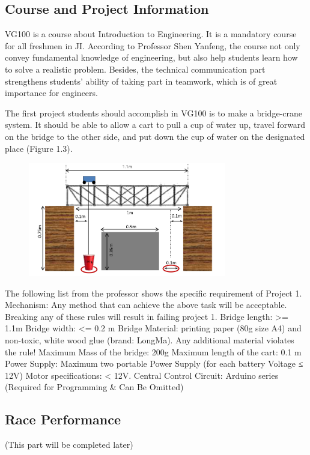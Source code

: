 \subsection{Course and Project Information}


VG100 is a course about Introduction to Engineering. It is a mandatory course
for all freshmen in JI. According to Professor Shen Yanfeng, the course not only
convey fundamental knowledge of engineering, but also help students learn how to
solve a realistic problem. Besides, the technical communication part strengthens
students’ ability of taking part in teamwork, which is of great importance for
engineers.  

The first project students should accomplish in VG100 is to make a bridge-crane
system. It should be able to allow a cart to pull a cup of water up, travel
forward on the bridge to the other side, and put down the cup of water on the
designated place (Figure 1.3).  

\begin{figure}[htbp]
\centering
\includegraphics[height=5cm]{figure/structureOfP1}
\label{fig:structureOfP1}
\caption{}
\end{figure}

The following list from the professor shows the specific requirement of Project 1.
Mechanism: Any method that can achieve the above task will be acceptable.
Breaking any of these rules will result in failing project 1.  
Bridge length:  >= 1.1m 
Bridge width:  <= 0.2 m 
Bridge Material: printing paper (80g size A4) and non-toxic, white wood glue
(brand: LongMa). Any additional material violates the rule!  
Maximum Mass of the bridge: 200g 
Maximum length of the cart: 0.1 m 
Power Supply: Maximum two portable Power Supply (for each battery Voltage ≤ 12V) 
Motor specifications: < 12V.  
Central Control Circuit: Arduino series (Required for Programming \& Can Be Omitted)

\subsection{Race Performance}
(This part will be completed later)


